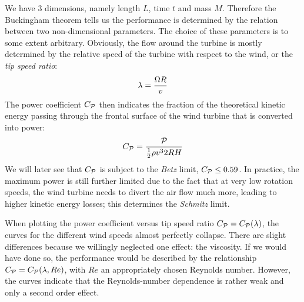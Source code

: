 We have 3 dimensions, namely length $L$, time $t$ and mass
$M$. Therefore the Buckingham theorem tells us the performance is
determined by the relation between two non-dimensional parameters. The
choice of these parameters is to some extent arbitrary. Obviously, the
flow around the turbine is mostly determined by the relative speed of
the turbine with respect to the wind, or the \emph{tip speed ratio}:
\begin{align*}
  \lambda = \frac{\Omega R}{v} \\
\end{align*}
The power coefficient $C_{\mathcal P}$ then indicates the fraction of the
theoretical kinetic energy passing through the frontal surface of the
wind turbine that is converted into power:
\begin{align*}
  C_{\mathcal P} = \frac{\mathcal P}{\frac{1}{2} \rho v^3 2 R H}
\end{align*}
We will later see that $C_{\mathcal P}$ is subject to the \emph{Betz} limit,
\ie $C_{\mathcal P} \leq 0.59$. In practice, the maximum power is still
further limited due to the fact that at very low rotation speeds, the
wind turbine needs to divert the air flow much more, leading to higher
kinetic energy losses; this determines the \emph{Schmitz} limit.

When plotting the power coefficient versus tip speed ratio $C_{\mathcal P}=
C_{\mathcal P}(\lambda)$, the curves for the different wind speeds almost
perfectly collapse. There are slight differences because we willingly
neglected one effect: the viscosity. If we would have done so, the
performance would be described by the relationship $C_{\mathcal P} =
C_{\mathcal P}(\lambda,Re)$, with $Re$ an appropriately chosen Reynolds
number. However, the curves indicate that the Reynolds-number
dependence is rather weak and only a second order effect.

